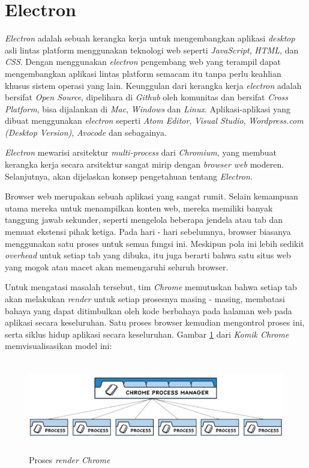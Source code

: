 \newpage
\section{Electron}
\textit{Electron} adalah sebuah kerangka kerja untuk mengembangkan aplikasi \textit{desktop} asli lintas platform menggunakan teknologi web seperti \textit{JavaScript}, \textit{HTML}, dan \textit{CSS}. Dengan menggunakan \textit{electron} pengembang web yang terampil dapat mengembangkan aplikasi lintas platform semacam itu tanpa perlu keahlian khusus sistem operasi yang lain. Keunggulan dari kerangka kerja \textit{electron} adalah bersifat \textit{Open Source}, dipelihara di \textit{Github} oleh komunitas dan bersifat \textit{Cross Platform}, bisa dijalankan di \textit{Mac}, \textit{Windows} dan \textit{Linux}. Aplikasi-aplikasi yang dibuat menggunakan \textit{electron} seperti \textit{Atom Editor}, \textit{Visual Studio}, \textit{Wordpress.com (Desktop Version)}, \textit{Avocode} dan sebagainya.

\textit{Electron} mewarisi arsitektur \textit{multi-process} dari \textit{Chromium}, yang membuat kerangka kerja secara arsitektur sangat mirip dengan \textit{browser web} moderen. Selanjutnya, akan dijelaskan konsep pengetahuan tentang \textit{Electron}.

Browser web merupakan sebuah aplikasi yang sangat rumit. Selain kemampuan utama mereka untuk menampilkan konten web, mereka memiliki banyak tanggung jawab sekunder, seperti mengelola beberapa jendela atau tab dan memuat ekstensi pihak ketiga. Pada hari - hari sebelumnya, browser biasanya menggunakan satu proses untuk semua fungsi ini. Meskipun pola ini lebih sedikit \textit{overhead} untuk setiap tab yang dibuka, itu juga berarti bahwa satu situs web yang mogok atau macet akan memengaruhi seluruh browser.

Untuk mengatasi masalah tersebut, tim \textit{Chrome} memutuskan  bahwa setiap tab akan melakukan \textit{render} untuk setiap prosesnya masing - masing, membatasi bahaya yang dapat ditimbulkan oleh kode berbahaya pada halaman web pada aplikasi secara keseluruhan. Satu proses browser kemudian mengontrol proses ini, serta siklus hidup aplikasi secara keseluruhan. Gambar \ref{fig:gambar15} dari \textit{Komik Chrome} memvisualisasikan model ini:

\begin{figure}[H]
    \centering
    \includegraphics[width=12cm, height=4cm]{Gambar/Rendered Processes.jpg}
    \caption{Proses \textit{render Chrome}}
    \label{fig:gambar15}
\end{figure}

